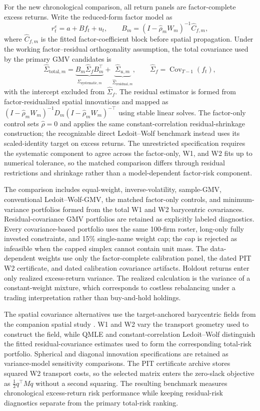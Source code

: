 For the new chronological comparison, all return panels are factor-complete
excess returns. Write the reduced-form factor model as
\[
  r_t^e = a + B f_t + u_t,
  \qquad
  B_m=(I-\widehat\rho_m W_m)^{-1}\widehat C_{f,m},
\]
where $\widehat C_{f,m}$ is the fitted factor-coefficient block before spatial
propagation. Under the working factor--residual orthogonality assumption, the
total covariance used by the primary GMV candidates is
\[
  \widehat\Sigma_{\mathrm{total},m}
  =
  \underbrace{B_m\widehat\Sigma_f
  B_m^\top}_{\widehat\Sigma_{\mathrm{systematic},m}}
  +
  \underbrace{\widehat\Sigma_{u,m}}_{\widehat\Sigma_{\mathrm{residual},m}},
  \qquad
  \widehat\Sigma_f=\operatorname{Cov}_{T-1}(f_t),
\]
with the intercept excluded from $\widehat\Sigma_f$. The residual estimator
is formed from factor-residualized spatial innovations and mapped as
$(I-\widehat\rho_m W_m)^{-1}D_m(I-\widehat\rho_m W_m)^{-\top}$ using stable
linear solves. The factor-only control sets $\widehat\rho=0$ and applies the
same constant-correlation residual-shrinkage construction; the recognizable
direct Ledoit--Wolf benchmark instead uses its scaled-identity target on
excess returns. The unrestricted specification requires the systematic
component to agree across the factor-only, W1, and W2 fits up to numerical
tolerance, so the matched comparison differs through residual restrictions and
shrinkage rather than a model-dependent factor-risk component.

The comparison includes equal-weight, inverse-volatility, sample-GMV,
conventional Ledoit--Wolf-GMV, the matched factor-only controls, and
minimum-variance portfolios formed from the total W1 and W2 barycentric
covariances. Residual-covariance GMV portfolios are retained as explicitly
labeled diagnostics. Every covariance-based portfolio uses the same 100-firm
roster, long-only fully invested constraints, and 15\% single-name weight cap;
the cap is rejected as infeasible when the capped simplex cannot contain unit
mass. The data-dependent weights use only the factor-complete calibration
panel, the dated PIT W2 certificate, and dated calibration covariance
artifacts. Holdout returns enter only realized excess-return variance.
The realized calculation is the variance of a constant-weight mixture, which
corresponds to costless rebalancing under a trading interpretation rather than
buy-and-hold holdings.

The spatial covariance alternatives use the target-anchored barycentric fields
from the companion spatial study \citep{gawronsky_spatial_2027}. W1 and W2
vary the transport geometry used to construct the field, while QMLE and
constant-correlation Ledoit--Wolf distinguish the fitted residual-covariance
estimates used to form the corresponding total-risk portfolio. Spherical and
diagonal innovation specifications are retained as variance-model sensitivity
comparisons. The PIT certificate archive stores squared W2 transport costs,
so the selected matrix enters the zero-slack objective as
$\frac12q^\top Mq$ without a second squaring. The resulting benchmark measures
chronological excess-return risk performance while keeping residual-risk
diagnostics separate from the primary total-risk ranking.

